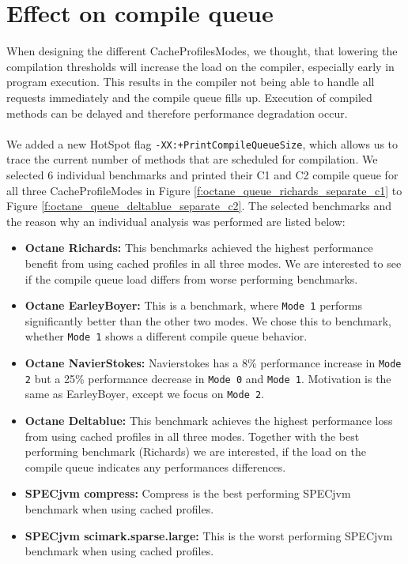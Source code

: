 \section{Effect on compile queue}
\label{s:perf_compilequeue}
When designing the different CacheProfilesModes, we thought, that lowering the compilation thresholds will increase the load on the compiler, especially early in program execution. This results in the compiler not being able to handle all requests immediately and the compile queue fills up. Execution of compiled methods can be delayed and therefore performance degradation occur.
\\\\
We added a new HotSpot flag \texttt{-XX:+PrintCompileQueueSize}, which allows us to trace the current number of methods that are scheduled for compilation. We selected 6 individual benchmarks and printed their C1 and C2 compile queue for all three CacheProfileModes in Figure \ref{f:octane_queue_richards_separate_c1} to Figure \ref{f:octane_queue_deltablue_separate_c2}.
The selected benchmarks and the reason why an individual analysis was performed are listed below:
\begin{itemize}
  \item \textbf{Octane Richards:} This benchmarks achieved the highest performance benefit from using cached profiles in all three modes. We are interested to see if the compile queue load differs from worse performing benchmarks.
  \item \textbf{Octane EarleyBoyer:} This is a benchmark, where \texttt{Mode 1} performs significantly better than the other two modes. We chose this to benchmark, whether \texttt{Mode 1} shows a different compile queue behavior.
  \item \textbf{Octane NavierStokes:} Navierstokes has a 8\% performance increase in \texttt{Mode 2} but a 25\% performance decrease in \texttt{Mode 0} and \texttt{Mode 1}. Motivation is the same as EarleyBoyer, except we focus on \texttt{Mode 2}.
  \item \textbf{Octane Deltablue:} This benchmark achieves the highest performance loss from using cached profiles in all three modes. Together with the best performing benchmark (Richards) we are interested, if the load on the compile queue indicates any performances differences.
  \item \textbf{SPECjvm compress:} Compress is the best performing SPECjvm benchmark when using cached profiles. 
  \item \textbf{SPECjvm scimark.sparse.large:} This is the worst performing SPECjvm benchmark when using cached profiles. 
\end{itemize}
